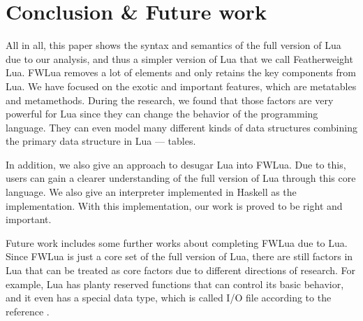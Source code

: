 \chapter{Conclusion \& Future work}
All in all, this paper shows the syntax and semantics of the full version of Lua due to our analysis, and thus a simpler version of Lua that we call Featherweight Lua. FWLua removes a lot of elements and only retains the key components from Lua. We have focused on the exotic and important features, which are metatables and metamethods. During the research, we found that those factors are very powerful for Lua since they can change the behavior of the programming language. They can even model many different kinds of data structures combining the primary data structure in Lua --- tables.

In addition, we also give an approach to desugar Lua into FWLua. Due to this, users can gain a clearer understanding of the full version of Lua through this core language. We also give an interpreter implemented in Haskell as the implementation. With this implementation,
our work is proved to be right and important.

Future work includes some further works about completing FWLua due to Lua.
Since FWLua is just a core set of the full version of Lua, there are still factors in Lua that can be treated as core factors due to different directions of research. For example, Lua has planty reserved functions that can control its basic behavior, and it even has a special data type, which is called I/O file according to the reference \cite{PIL}.
